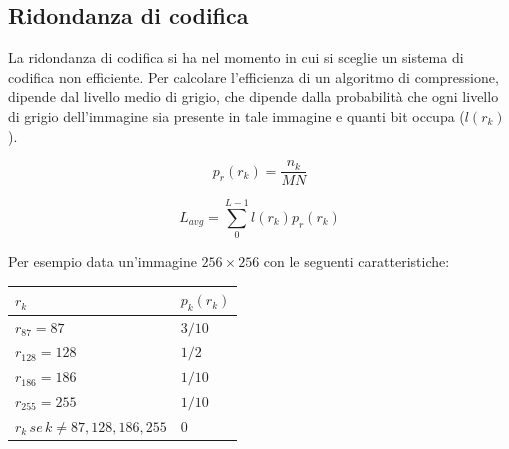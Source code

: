 \subsection{Ridondanza di codifica}
La ridondanza di codifica si ha nel momento in cui si sceglie un sistema di codifica non efficiente. Per calcolare l'efficienza di un
algoritmo di compressione, dipende dal livello medio di grigio, che dipende dalla probabilità che ogni livello di grigio dell'immagine
sia presente in tale immagine e quanti bit occupa ($l(r_k)$).
\begin{center}
\begin{minipage}{0.48\textwidth} %
    \centering
    \begin{equation*}
        p_r(r_k)=\frac{n_k}{MN}
    \end{equation*}
\end{minipage}
\hfill %
\begin{minipage}{0.48\textwidth} %
    \centering
    \begin{equation*}
        L_{avg}=\sum_{0}^{L-1}l(r_k)p_r(r_k)
    \end{equation*}
\end{minipage}
\end{center}
Per esempio data un'immagine $256 \times 256$ con le seguenti caratteristiche:
\begin{table}[H] %
    \centering
    \begin{tabular}{| C{5cm} | C{5cm} |} 
            \hline
            
            \textbf{$r_k$} & \textbf{$p_k(r_k)$} \\ 
            \hline %
            $r_{87}=87$ & $3/10$ \\
            \hline %
            $r_{128}=128$ & $1/2$ \\
            \hline %
            $r_{186}=186$ & $1/10$ \\
            \hline %
            $r_{255}=255$ & $1/10$ \\
            \hline %
            $r_{k} \, se \, k \neq 87, 128, 186, 255$ & ${0}$ \\
            \hline
    \end{tabular}
\end{table}
